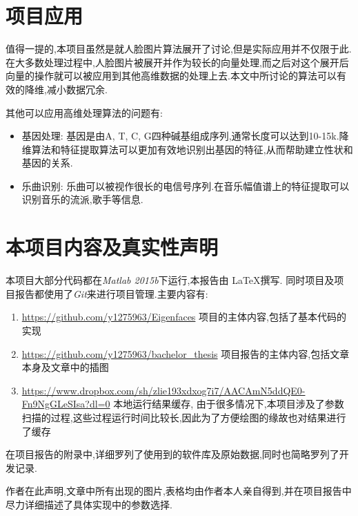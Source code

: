\section{项目应用}
值得一提的,本项目虽然是就人脸图片算法展开了讨论,但是实际应用并不仅限于此.在大多数处理过程中,人脸图片被展开并作为较长的向量处理,而之后对这个展开后向量的操作就可以被应用到其他高维数据的处理上去.本文中所讨论的算法可以有效的降维,减小数据冗余.\newline


其他可以应用高维处理算法的问题有:

\begin{itemize}
	\item{基因处理: } 基因是由A, T, C, G四种碱基组成序列,通常长度可以达到10-15k\cite{twine2011whole}.降维算法和特征提取算法可以更加有效地识别出基因的特征,从而帮助建立性状和基因的关系.
	\item{乐曲识别:} 乐曲可以被视作很长的电信号序列.在音乐幅值谱上的特征提取可以识别音乐的流派,歌手等信息.
\end{itemize}



\section{本项目内容及真实性声明}

本项目大部分代码都在\textit{Matlab 2015b}下运行,本报告由 \LaTeX 撰写. 同时项目及项目报告都使用了\textit{Git}来进行项目管理.主要内容有:
\begin{enumerate}
	\item \url{https://github.com/y1275963/Eigenfaces} 项目的主体内容,包括了基本代码的实现
	\item \url{https://github.com/y1275963/bachelor_thesis} 项目报告的主体内容,包括文章本身及文章中的插图
	\item \url{https://www.dropbox.com/sh/zlie193xdxog7i7/AACAmN5ddQE0-Fn9NgGLeSIsa?dl=0} 本地运行结果缓存, 由于很多情况下,本项目涉及了参数扫描的过程,这些过程运行时间比较长,因此为了方便绘图的缘故也对结果进行了缓存
\end{enumerate}

在项目报告的附录中,详细罗列了使用到的软件库及原始数据,同时也简略罗列了开发记录.\newline


作者在此声明,文章中所有出现的图片,表格均由作者本人亲自得到,并在项目报告中尽力详细描述了具体实现中的参数选择.